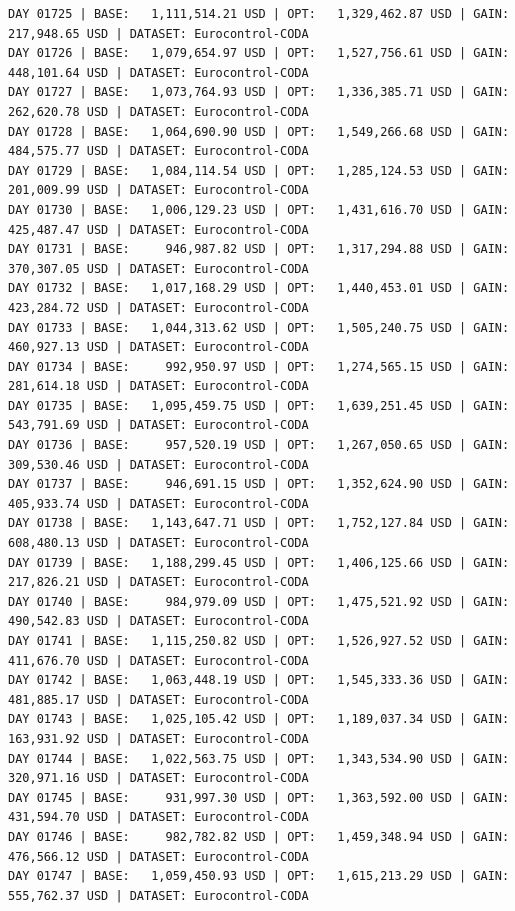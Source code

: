 \documentclass[11pt,a4paper]{article}
\begin{document}
\begin{verbatim}
DAY 01725 | BASE:   1,111,514.21 USD | OPT:   1,329,462.87 USD | GAIN: 217,948.65 USD | DATASET: Eurocontrol-CODA
DAY 01726 | BASE:   1,079,654.97 USD | OPT:   1,527,756.61 USD | GAIN: 448,101.64 USD | DATASET: Eurocontrol-CODA
DAY 01727 | BASE:   1,073,764.93 USD | OPT:   1,336,385.71 USD | GAIN: 262,620.78 USD | DATASET: Eurocontrol-CODA
DAY 01728 | BASE:   1,064,690.90 USD | OPT:   1,549,266.68 USD | GAIN: 484,575.77 USD | DATASET: Eurocontrol-CODA
DAY 01729 | BASE:   1,084,114.54 USD | OPT:   1,285,124.53 USD | GAIN: 201,009.99 USD | DATASET: Eurocontrol-CODA
DAY 01730 | BASE:   1,006,129.23 USD | OPT:   1,431,616.70 USD | GAIN: 425,487.47 USD | DATASET: Eurocontrol-CODA
DAY 01731 | BASE:     946,987.82 USD | OPT:   1,317,294.88 USD | GAIN: 370,307.05 USD | DATASET: Eurocontrol-CODA
DAY 01732 | BASE:   1,017,168.29 USD | OPT:   1,440,453.01 USD | GAIN: 423,284.72 USD | DATASET: Eurocontrol-CODA
DAY 01733 | BASE:   1,044,313.62 USD | OPT:   1,505,240.75 USD | GAIN: 460,927.13 USD | DATASET: Eurocontrol-CODA
DAY 01734 | BASE:     992,950.97 USD | OPT:   1,274,565.15 USD | GAIN: 281,614.18 USD | DATASET: Eurocontrol-CODA
DAY 01735 | BASE:   1,095,459.75 USD | OPT:   1,639,251.45 USD | GAIN: 543,791.69 USD | DATASET: Eurocontrol-CODA
DAY 01736 | BASE:     957,520.19 USD | OPT:   1,267,050.65 USD | GAIN: 309,530.46 USD | DATASET: Eurocontrol-CODA
DAY 01737 | BASE:     946,691.15 USD | OPT:   1,352,624.90 USD | GAIN: 405,933.74 USD | DATASET: Eurocontrol-CODA
DAY 01738 | BASE:   1,143,647.71 USD | OPT:   1,752,127.84 USD | GAIN: 608,480.13 USD | DATASET: Eurocontrol-CODA
DAY 01739 | BASE:   1,188,299.45 USD | OPT:   1,406,125.66 USD | GAIN: 217,826.21 USD | DATASET: Eurocontrol-CODA
DAY 01740 | BASE:     984,979.09 USD | OPT:   1,475,521.92 USD | GAIN: 490,542.83 USD | DATASET: Eurocontrol-CODA
DAY 01741 | BASE:   1,115,250.82 USD | OPT:   1,526,927.52 USD | GAIN: 411,676.70 USD | DATASET: Eurocontrol-CODA
DAY 01742 | BASE:   1,063,448.19 USD | OPT:   1,545,333.36 USD | GAIN: 481,885.17 USD | DATASET: Eurocontrol-CODA
DAY 01743 | BASE:   1,025,105.42 USD | OPT:   1,189,037.34 USD | GAIN: 163,931.92 USD | DATASET: Eurocontrol-CODA
DAY 01744 | BASE:   1,022,563.75 USD | OPT:   1,343,534.90 USD | GAIN: 320,971.16 USD | DATASET: Eurocontrol-CODA
DAY 01745 | BASE:     931,997.30 USD | OPT:   1,363,592.00 USD | GAIN: 431,594.70 USD | DATASET: Eurocontrol-CODA
DAY 01746 | BASE:     982,782.82 USD | OPT:   1,459,348.94 USD | GAIN: 476,566.12 USD | DATASET: Eurocontrol-CODA
DAY 01747 | BASE:   1,059,450.93 USD | OPT:   1,615,213.29 USD | GAIN: 555,762.37 USD | DATASET: Eurocontrol-CODA

\end{verbatim}
\end{document}

